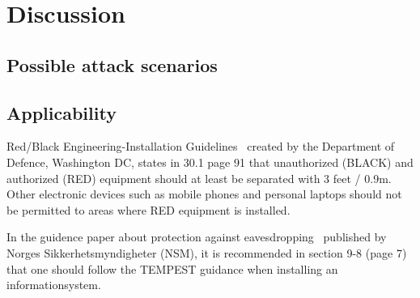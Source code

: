 \chapter{Discussion}
\label{chp6:discussion} 

\section{Possible attack scenarios}\label{chp6:sec:attack_scenarios}

\section{Applicability}\label{chp6:sec:applicability}

Red/Black Engineering-Installation Guidelines~\cite{MIL_HDBK_232} created by the Department of Defence, Washington DC, states in 30.1 page 91 that unauthorized (BLACK) and authorized (RED) equipment should at least be separated with 3 feet / 0.9m. 
Other electronic devices such as mobile phones and personal laptops should not be permitted to areas where RED equipment is installed. 


In the guidence paper about protection against eavesdropping~\cite{NSM_avlytting} published by Norges Sikkerhetsmyndigheter (NSM), it is recommended in section 9-8 (page 7) that one should follow the TEMPEST guidance when installing an informationsystem.